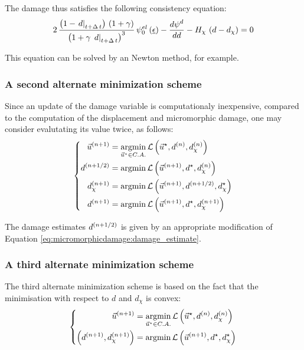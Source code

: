 The damage thus satisfies the following consistency equation:
\[
2\,\Frac{\paren{1-\ets{d}}\,\paren{1+\gamma}}{\paren{1+\gamma\,\ets{d}}^{3}}\,\freeenergyel_{0}\paren{\tepsilon}
-\derivtot{\freeenergyd}{d}-H_{\chi}\,\paren{d-d_{\chi}}=0
\]

This equation can be solved by an Newton method, for example.

\subsubsection{A second alternate minimization scheme}

Since an update of the damage variable is computationaly inexpensive,
compared to the computation of the displacement and micromorphic damage,
one may consider evalutating its value twice, as follows:
\[
\left\{
\begin{aligned}
\iter{n+1}{\vec{u}} &= \underset{\vec{u}^{\star}\in C.A.}{\argmin}\, \mathcal{L}\paren{\vec{u}^{\star},\iter{n}{d},\iter{n}{d_{\chi}}}\\
\iter{n+1/2}{d} &= \argmin \,\mathcal{L}\paren{\iter{n+1}{\vec{u}},d^{\star},\iter{n}{d_{\chi}}} \\
\iter{n+1}{d_{\chi}} &= \argmin \,\mathcal{L}\paren{\iter{n+1}{\vec{u}},\iter{n+1/2}{d},d_{\chi}^{\star}} \\
\iter{n+1}{d} &= \argmin \,\mathcal{L}\paren{\iter{n+1}{\vec{u}},d^{\star},\iter{n+1}{d_{\chi}}} \\
\end{aligned}
\right.
\]

The damage estimates \(\iter{n+1/2}{d}\) is given by an appropriate
modification of Equation \eqref{eq:micromorphicdamage:damage_estimate}.

\subsubsection{A third alternate minimization scheme}

The third alternate minimization scheme is based on the fact that the
minimisation with respect to \(d\) and \(d_{\chi}\) is convex:
\[
\left\{
\begin{aligned}
\iter{n+1}{\vec{u}} &= \underset{\vec{u}^{\star}\in C.A.}{\argmin}\, \mathcal{L}\paren{\vec{u}^{\star},\iter{n}{d},\iter{n}{d_{\chi}}}\\
\paren{\iter{n+1}{d},\iter{n+1}{d_{\chi}}} &= \argmin \,\mathcal{L}\paren{\iter{n+1}{\vec{u}},d^{\star},d_{\chi}^{\star}}
\end{aligned}
\right.
\]

